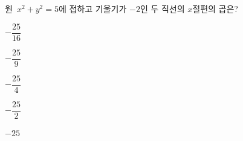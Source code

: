 원~$x^2+y^2=5$에 접하고 기울기가 $-2$인 두 직선의 $x$절편의 곱은?
\begin{choices32}{\rule[-3ex]{0pt}{8ex}$-\dfrac{25}{16}$}{\rule[-3ex]{0pt}{8ex}$-\dfrac{25}{9}$}{\rule[-3ex]{0pt}{8ex}$-\dfrac{25}{4}$}{\rule[-3ex]{0pt}{8ex}$-\dfrac{25}{2}$}{\rule[-3ex]{0pt}{8ex}$-25$}\end{choices32}
